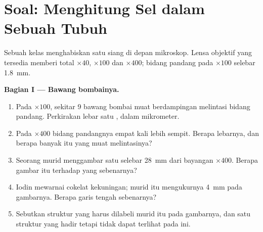 \section{Soal: Menghitung Sel dalam Sebuah Tubuh}

\begin{problem}
\label{pb:g10:cells-common-unit:1}
Sebuah kelas menghabiskan satu siang di depan mikroskop. Lensa objektif
yang tersedia memberi  total $\times 40$, $\times 100$ dan
$\times 400$; bidang pandang pada $\times 100$ selebar \qty{1.8}{mm}.

\medskip
\noindent\textbf{Bagian I --- Bawang bombainya.}
\begin{enumerate}
  \item Pada $\times 100$, sekitar 9  bawang bombai muat
        berdampingan melintasi bidang pandang. Perkirakan lebar satu
        , dalam mikrometer.
  \item Pada $\times 400$ bidang pandangnya empat kali lebih sempit.
        Berapa lebarnya, dan berapa banyak  itu yang muat melintasinya?
  \item Seorang murid menggambar satu  selebar \qty{28}{mm} dari
        bayangan $\times 400$. Berapa  gambar itu terhadap
         yang sebenarnya?
  \item Iodin mewarnai  cokelat kekuningan; murid itu
        mengukurnya \qty{4}{mm} pada gambarnya. Berapa garis tengah sebenarnya?
  \item Sebutkan struktur yang harus dilabeli murid itu pada gambarnya,
        dan satu struktur yang hadir tetapi tidak dapat terlihat pada
         ini.
\end{enumerate}


\end{problem}
